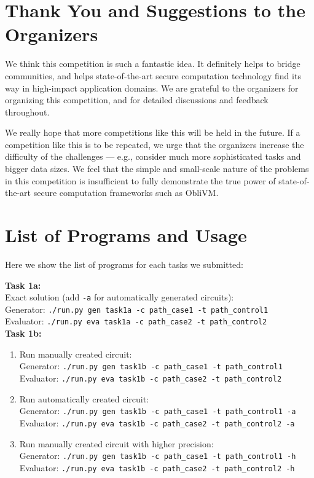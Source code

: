 \documentclass[11pt]{article}
\begin{document}
\section{Thank You and Suggestions to the Organizers}
We think this competition is such a fantastic idea. 
It definitely helps to bridge communities, and helps 
state-of-the-art secure computation technology  
find its way in high-impact application domains.
We are grateful to the organizers for organizing this competition,
and for detailed discussions and feedback 
throughout.

We really hope that more competitions like this will be held in the future.
If a competition like this is to be repeated, we 
urge that the organizers increase the difficulty 
of the challenges --- e.g., consider much more sophisticated tasks
and bigger data sizes. 
We feel that the simple and small-scale nature of the problems  
in this competition is insufficient to fully demonstrate the true power
of state-of-the-art secure computation frameworks such as {\sf ObliVM}.

\section{List of Programs and Usage}
Here we show the list of programs for each tasks we submitted:

\noindent\textbf{Task 1a:}\\
Exact solution (add {\tt -a} for automatically generated circuits):\\
Generator: {\tt ./run.py gen task1a -c path\_case1 -t path\_control1}\\
Evaluator: {\tt ./run.py eva task1a -c path\_case2 -t path\_control2}\\

\noindent\textbf{Task 1b:}\\
\begin{enumerate}
\item Run manually created circuit:\\
Generator: {\tt ./run.py gen task1b -c path\_case1 -t path\_control1}\\
Evaluator: {\tt ./run.py eva task1b -c path\_case2 -t path\_control2}

\item Run automatically created circuit:\\
Generator: {\tt ./run.py gen task1b -c path\_case1 -t path\_control1 -a}\\
Evaluator: {\tt ./run.py eva task1b -c path\_case2 -t path\_control2 -a}

\item Run manually created circuit with higher precision:\\
Generator: {\tt ./run.py gen task1b -c path\_case1 -t path\_control1 -h}\\
Evaluator: {\tt ./run.py eva task1b -c path\_case2 -t path\_control2 -h}

\end{enumerate}
\end{document}
